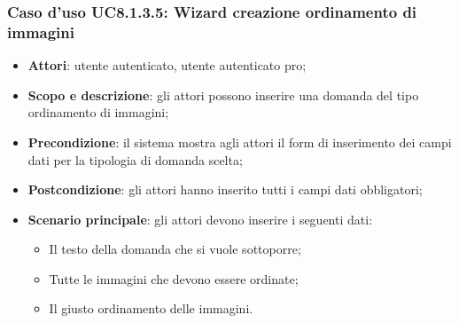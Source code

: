 \subsubsection{Caso d’uso UC8.1.3.5: Wizard creazione ordinamento di immagini}
\begin{itemize}
	\item\textbf{Attori}: utente autenticato, utente autenticato pro;
	\item\textbf{Scopo e descrizione}: gli attori possono inserire una domanda del tipo ordinamento di immagini;
	\item\textbf{Precondizione}: il sistema mostra agli attori il form di inserimento dei campi dati per la tipologia di domanda scelta; 
	\item \textbf{Postcondizione}: gli attori hanno inserito tutti i campi dati obbligatori;
	\item\textbf{Scenario principale}: gli attori devono inserire i seguenti dati:
	\begin{itemize}
		\item Il testo della domanda che si vuole sottoporre;
		\item Tutte le immagini che devono essere ordinate;
		\item Il giusto ordinamento delle immagini.
	\end{itemize}
\end{itemize}